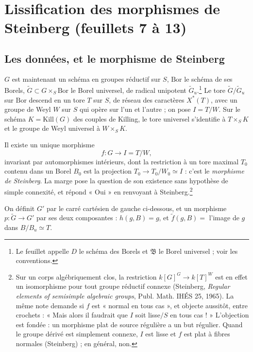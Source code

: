 \documentclass[11pt,a4paper]{article}
\begin{document}
\section*{Lissification des morphismes de Steinberg (feuillets 7 à 13)}

\subsection*{Les données, et le morphisme de Steinberg}

$G$ est maintenant un schéma en groupes réductif sur $S$, $\mathrm{Bor}$ le
schéma de ses Borels, $\widetilde{G}\subset G\times_{S}\mathrm{Bor}$ le Borel
universel, de radical unipotent $\widetilde{G}_{u}$.\footnote{Le feuillet
appelle $D$ le schéma des Borels et $\mathfrak{B}$ le Borel universel ; voir
les conventions.} Le tore $\widetilde{G}/\widetilde{G}_{u}$ sur
$\mathrm{Bor}$ descend en un tore $T$ sur $S$, de réseau des caractères
$X^{*}(T)$, avec un groupe de Weyl $W$ sur $S$ qui opère sur l'un et l'autre ;
on pose $I=T/W$. Sur le schéma $K=\mathrm{Kill}(G)$ des couples de Killing, le
tore universel s'identifie à $T\times_{S}K$ et le groupe de Weyl universel à
$W\times_{S}K$.

Il existe un unique morphisme
\[
  f\colon G\longrightarrow I=T/W,
\]
invariant par automorphismes intérieurs, dont la restriction à un tore maximal
$T_{0}$ contenu dans un Borel $B_{0}$ est la projection
$T_{0}\to T_{0}/W_{0}\simeq I$ : c'est le \emph{morphisme de Steinberg}.
La marge pose la question de son existence sans hypothèse de simple connexité,
et répond « Oui » en renvoyant à Steinberg.\footnote{Sur un corps
algébriquement clos, la restriction $k[G]^{G}\to k[T]^{W}$ est en effet un
isomorphisme pour tout groupe réductif connexe (Steinberg, \emph{Regular
elements of semisimple algebraic groups}, Publ. Math. IHÉS 25, 1965). La
même note demande si $f$ est « normal en tous cas », et objecte aussitôt, entre
crochets : « Mais alors il faudrait que $I$ soit lisse$/S$ en tous cas ! »
L'objection est fondée : un morphisme plat de source régulière a un but
régulier. Quand le groupe dérivé est simplement connexe, $I$ est lisse et $f$
est plat à fibres normales (Steinberg) ; en général, non.}

On définit $G'$ par le carré cartésien de gauche ci-dessous, et un morphisme
$p\colon\widetilde{G}\to G'$ par ses deux composantes :
$h(g,B)=g$, et $\tilde f(g,B)=$ l'image de $g$ dans $B/B_{u}\simeq T$.

\end{document}
